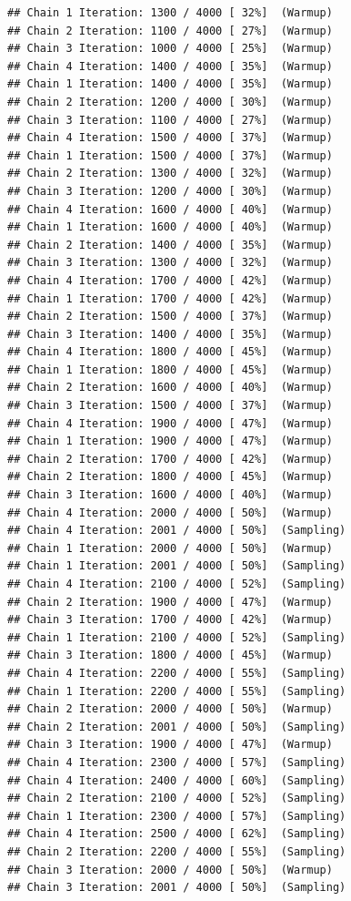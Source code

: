 \documentclass[
]{article}
\begin{document}
\begin{verbatim}
## Chain 1 Iteration: 1300 / 4000 [ 32%]  (Warmup) 
## Chain 2 Iteration: 1100 / 4000 [ 27%]  (Warmup) 
## Chain 3 Iteration: 1000 / 4000 [ 25%]  (Warmup) 
## Chain 4 Iteration: 1400 / 4000 [ 35%]  (Warmup) 
## Chain 1 Iteration: 1400 / 4000 [ 35%]  (Warmup) 
## Chain 2 Iteration: 1200 / 4000 [ 30%]  (Warmup) 
## Chain 3 Iteration: 1100 / 4000 [ 27%]  (Warmup) 
## Chain 4 Iteration: 1500 / 4000 [ 37%]  (Warmup) 
## Chain 1 Iteration: 1500 / 4000 [ 37%]  (Warmup) 
## Chain 2 Iteration: 1300 / 4000 [ 32%]  (Warmup) 
## Chain 3 Iteration: 1200 / 4000 [ 30%]  (Warmup) 
## Chain 4 Iteration: 1600 / 4000 [ 40%]  (Warmup) 
## Chain 1 Iteration: 1600 / 4000 [ 40%]  (Warmup) 
## Chain 2 Iteration: 1400 / 4000 [ 35%]  (Warmup) 
## Chain 3 Iteration: 1300 / 4000 [ 32%]  (Warmup) 
## Chain 4 Iteration: 1700 / 4000 [ 42%]  (Warmup) 
## Chain 1 Iteration: 1700 / 4000 [ 42%]  (Warmup) 
## Chain 2 Iteration: 1500 / 4000 [ 37%]  (Warmup) 
## Chain 3 Iteration: 1400 / 4000 [ 35%]  (Warmup) 
## Chain 4 Iteration: 1800 / 4000 [ 45%]  (Warmup) 
## Chain 1 Iteration: 1800 / 4000 [ 45%]  (Warmup) 
## Chain 2 Iteration: 1600 / 4000 [ 40%]  (Warmup) 
## Chain 3 Iteration: 1500 / 4000 [ 37%]  (Warmup) 
## Chain 4 Iteration: 1900 / 4000 [ 47%]  (Warmup) 
## Chain 1 Iteration: 1900 / 4000 [ 47%]  (Warmup) 
## Chain 2 Iteration: 1700 / 4000 [ 42%]  (Warmup) 
## Chain 2 Iteration: 1800 / 4000 [ 45%]  (Warmup) 
## Chain 3 Iteration: 1600 / 4000 [ 40%]  (Warmup) 
## Chain 4 Iteration: 2000 / 4000 [ 50%]  (Warmup) 
## Chain 4 Iteration: 2001 / 4000 [ 50%]  (Sampling) 
## Chain 1 Iteration: 2000 / 4000 [ 50%]  (Warmup) 
## Chain 1 Iteration: 2001 / 4000 [ 50%]  (Sampling) 
## Chain 4 Iteration: 2100 / 4000 [ 52%]  (Sampling) 
## Chain 2 Iteration: 1900 / 4000 [ 47%]  (Warmup) 
## Chain 3 Iteration: 1700 / 4000 [ 42%]  (Warmup) 
## Chain 1 Iteration: 2100 / 4000 [ 52%]  (Sampling) 
## Chain 3 Iteration: 1800 / 4000 [ 45%]  (Warmup) 
## Chain 4 Iteration: 2200 / 4000 [ 55%]  (Sampling) 
## Chain 1 Iteration: 2200 / 4000 [ 55%]  (Sampling) 
## Chain 2 Iteration: 2000 / 4000 [ 50%]  (Warmup) 
## Chain 2 Iteration: 2001 / 4000 [ 50%]  (Sampling) 
## Chain 3 Iteration: 1900 / 4000 [ 47%]  (Warmup) 
## Chain 4 Iteration: 2300 / 4000 [ 57%]  (Sampling) 
## Chain 4 Iteration: 2400 / 4000 [ 60%]  (Sampling) 
## Chain 2 Iteration: 2100 / 4000 [ 52%]  (Sampling) 
## Chain 1 Iteration: 2300 / 4000 [ 57%]  (Sampling) 
## Chain 4 Iteration: 2500 / 4000 [ 62%]  (Sampling) 
## Chain 2 Iteration: 2200 / 4000 [ 55%]  (Sampling) 
## Chain 3 Iteration: 2000 / 4000 [ 50%]  (Warmup) 
## Chain 3 Iteration: 2001 / 4000 [ 50%]  (Sampling) 

\end{verbatim}
\end{document}
